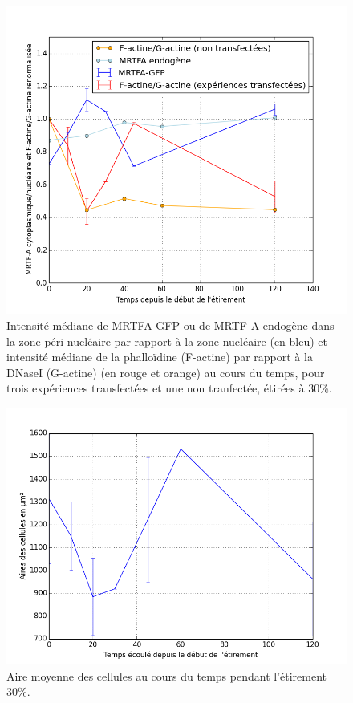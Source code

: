 \documentclass                                                                                                                                                                                                                                                                                                                                       {report}
\begin{document}
\begin{figure}[p]
\includegraphics[scale=0.5]{Figures/Et30_MRTFA_FG.png} 
\caption{\label{Et30_MRTFA_FG} Intensité médiane de MRTFA-GFP ou de MRTF-A endogène dans la zone péri-nucléaire par rapport à la zone nucléaire (en bleu) et intensité médiane de la phalloïdine (F-actine) par rapport à la DNaseI (G-actine) (en rouge et orange)  au cours du temps, pour trois expériences transfectées et une non tranfectée, étirées à 30\%.  }
\end{figure}

\begin{figure}[p]
\includegraphics[scale=0.5]{Figures/Et30_Aires.png} 
\caption{\label{Et30_Aires} Aire moyenne des cellules au cours du temps pendant l'étirement 30\%. }
\end{figure}
\end{document}
